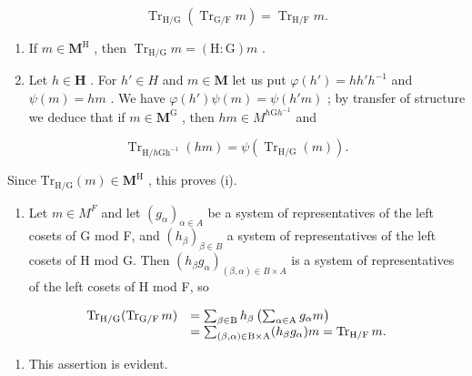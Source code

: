 \[
\operatorname{Tr} _ {\mathrm{H} / \mathrm{G}} \left(\operatorname{Tr} _ {\mathrm{G} / \mathrm{F}} m\right) = \operatorname{Tr} _ {\mathrm{H} / \mathrm{F}} m.
\]

\begin{enumerate}
\def\labelenumi{(\roman{enumi})}
\setcounter{enumi}{2}
\item
  If \(m \in \mathbf{M}^{\mathrm{H}}\) , then \(\operatorname{Tr}_{\mathrm{H} / \mathrm{G}} m = (\mathrm{H} : \mathrm{G}) m\) .
\item
  Let \(h \in \mathbf{H}\) . For \(h' \in H\) and \(m \in \mathbf{M}\) let us put \(\varphi(h') = hh'h^{-1}\) and \(\psi(m) = hm\) . We have \(\varphi(h') \psi(m) = \psi(h'm)\) ; by transfer of structure we deduce that if \(m \in \mathbf{M}^{\mathrm{G}}\) , then \(hm \in M^{h\mathrm{G}h^{-1}}\) and
\end{enumerate}

\[
\operatorname{Tr} _ {\mathrm{H} / h \mathrm{Gh} ^ {- 1}} (h m) = \psi \left(\operatorname{Tr} _ {\mathrm{H} / \mathrm{G}} (m)\right).
\]

Since \(\mathrm{Tr}_{\mathrm{H} / \mathrm{G}}(m)\in \mathbf{M}^{\mathrm{H}}\) , this proves (i).

\begin{enumerate}
\def\labelenumi{(\roman{enumi})}
\setcounter{enumi}{1}
\tightlist
\item
  Let \(m \in M^{F}\) and let \((g_{\alpha})_{\alpha \in A}\) be a system of representatives of the left cosets of G mod F, and \((h_{\beta})_{\beta \in B}\) a system of representatives of the left cosets of H mod G. Then \((h_{\beta}g_{\alpha})_{(\beta,\alpha) \in B \times A}\) is a system of representatives of the left cosets of H mod F, so
\end{enumerate}

\[
\begin{array}{r l} \operatorname{Tr} _ {\mathrm{H} / \mathrm{G}} (\operatorname{Tr} _ {\mathrm{G} / \mathrm{F}} m) & = \sum_ {\beta \in \mathrm{B}} h _ {\beta} \left(\sum_ {\alpha \in \mathrm{A}} g _ {\alpha} m\right) \\ & = \sum_ {(\beta , \alpha) \in \mathrm{B} \times \mathrm{A}} (h _ {\beta} g _ {\alpha}) m = \operatorname{Tr} _ {\mathrm{H} / \mathrm{F}} m. \end{array}
\]

\begin{enumerate}
\def\labelenumi{(\roman{enumi})}
\setcounter{enumi}{2}
\tightlist
\item
  This assertion is evident.
\end{enumerate}

